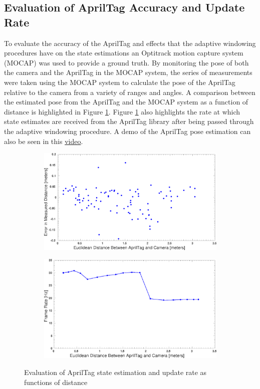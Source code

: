 \documentclass[11pt, twocolumn]{article}
\begin{document}
\subsection{Evaluation of AprilTag Accuracy and Update Rate}
To evaluate the accuracy of the AprilTag and effects that the adaptive windowing procedures have on the state estimations an Optitrack motion capture system (MOCAP) was used to provide a ground truth. By monitoring the pose of both the camera and the AprilTag in the MOCAP system, the series of measurements were taken using the MOCAP system to calculate the pose of the AprilTag relative to the camera from a variety of ranges and angles. A comparison between the estimated pose from the AprilTag and the MOCAP system as a function of distance is highlighted in Figure \ref{fig:AprilTag_eval}. Figure \ref{fig:AprilTag_eval} also highlights the rate at which state estimates are received from the AprilTag library after being passed through the adaptive windowing procedure. A demo of the AprilTag pose estimation can also be seen in this 
\href{https://www.youtube.com/watch?v=BBMlQphrqCY&index=19&list=PLk5z6lLnKFd6BD9EXWa09hqf6SNQhn59R}{video}.

\begin{figure}	
	\centering
	\begin{subfigure}[b]{\linewidth}
		\includegraphics[width=\textwidth]{images/Apr_FPS_vs_Dist.eps}
	\end{subfigure}

	\begin{subfigure}[b]{\linewidth}
		\includegraphics[width=\textwidth]{images/Apr_Distance_Error.eps}
	\end{subfigure}
	\caption{Evaluation of AprilTag state estimation and update rate as functions of distance}
	\label{fig:AprilTag_eval}	
\end{figure}
\end{document}

